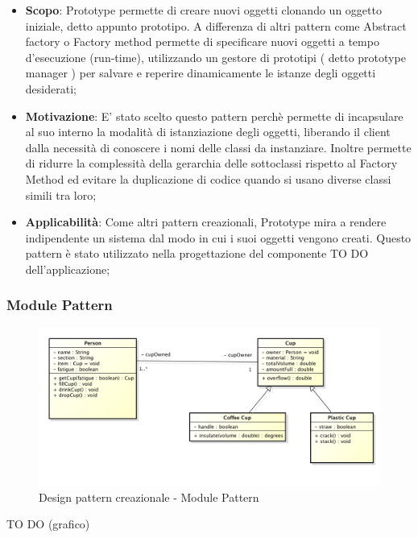 		
		\begin{itemize}
			\item \textbf{Scopo}: Prototype permette di creare nuovi oggetti clonando un oggetto iniziale, detto appunto prototipo. A differenza di altri pattern come Abstract factory o Factory method permette di specificare nuovi oggetti a tempo d'esecuzione (run-time), utilizzando un gestore di prototipi ( detto prototype manager ) per salvare e reperire dinamicamente le istanze degli oggetti desiderati;
			
			\item \textbf{Motivazione}: E' stato scelto questo pattern perchè permette di incapsulare al suo interno la modalità di istanziazione degli oggetti, liberando il client dalla necessità di conoscere i nomi delle classi da instanziare. Inoltre permette di ridurre la complessità della gerarchia delle sottoclassi rispetto al Factory Method ed evitare la duplicazione di codice quando si usano diverse classi simili tra loro;
			
			\item \textbf{Applicabilità}: Come altri pattern creazionali, Prototype mira a rendere indipendente un sistema dal modo in cui i suoi oggetti vengono creati. Questo pattern è stato utilizzato nella progettazione del componente TO DO dell'applicazione;
			
		\end{itemize}
		
		
		\newpage
		\subsubsection{Module Pattern} %
		
		
		\begin{figure}[htbp]
			\centering
			\centerline{\includegraphics[scale=0.3]{./images/example_graph.png}}
			\caption{Design pattern creazionale - Module Pattern}
		\end{figure}
		TO DO (grafico)
		
